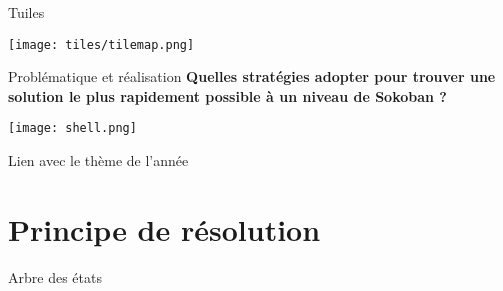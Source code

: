         \begin{frame}{Tuiles}
            \centering

            \texttt{[image: tiles/tilemap.png]}

        \end{frame}

        \begin{frame}{Problématique et réalisation}
            \centering
            \Large\textbf{Quelles stratégies adopter pour trouver une solution le plus rapidement possible à un niveau de Sokoban ?}

            \vspace{1.5cm} %
            \texttt{[image: shell.png]}
         \end{frame}

        \begin{frame}{Lien avec le thème de l'année}
            \centering
        \end{frame}

    \section{Principe de résolution}
        \begin{frame}{Arbre des états}
            
        \end{frame}

